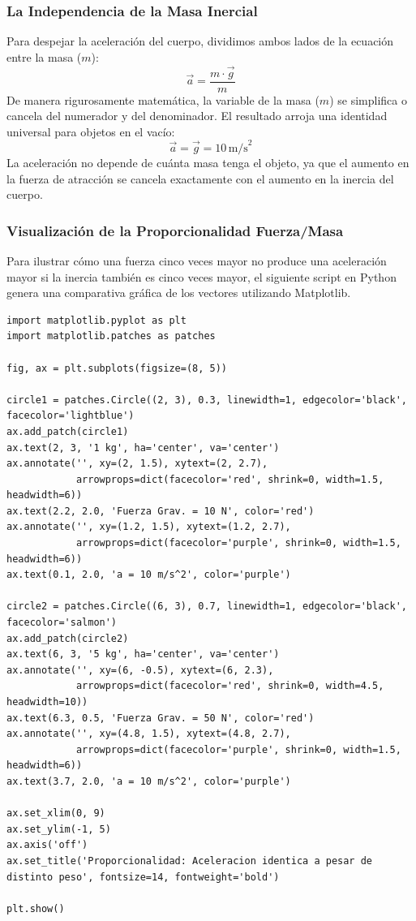 \documentclass[12pt]{article}
\begin{document}
\subsubsection*{La Independencia de la Masa Inercial}
Para despejar la aceleración del cuerpo, dividimos ambos lados de la ecuación entre la masa ($m$):
\begin{equation}
    \vec{a} = \frac{m \cdot \vec{g}}{m}
\end{equation}
De manera rigurosamente matemática, la variable de la masa ($m$) se simplifica o cancela del numerador y del denominador. El resultado arroja una identidad universal para objetos en el vacío:
\begin{equation}
    \vec{a} = \vec{g} = 10 \, \text{m/s}^2
\end{equation}
La aceleración no depende de cuánta masa tenga el objeto, ya que el aumento en la fuerza de atracción se cancela exactamente con el aumento en la inercia del cuerpo.

\subsubsection*{Visualización de la Proporcionalidad Fuerza/Masa}
Para ilustrar cómo una fuerza cinco veces mayor no produce una aceleración mayor si la inercia también es cinco veces mayor, el siguiente script en Python genera una comparativa gráfica de los vectores utilizando Matplotlib.

\begin{lstlisting}
import matplotlib.pyplot as plt
import matplotlib.patches as patches

fig, ax = plt.subplots(figsize=(8, 5))

circle1 = patches.Circle((2, 3), 0.3, linewidth=1, edgecolor='black', facecolor='lightblue')
ax.add_patch(circle1)
ax.text(2, 3, '1 kg', ha='center', va='center')
ax.annotate('', xy=(2, 1.5), xytext=(2, 2.7), 
            arrowprops=dict(facecolor='red', shrink=0, width=1.5, headwidth=6))
ax.text(2.2, 2.0, 'Fuerza Grav. = 10 N', color='red')
ax.annotate('', xy=(1.2, 1.5), xytext=(1.2, 2.7), 
            arrowprops=dict(facecolor='purple', shrink=0, width=1.5, headwidth=6))
ax.text(0.1, 2.0, 'a = 10 m/s^2', color='purple')

circle2 = patches.Circle((6, 3), 0.7, linewidth=1, edgecolor='black', facecolor='salmon')
ax.add_patch(circle2)
ax.text(6, 3, '5 kg', ha='center', va='center')
ax.annotate('', xy=(6, -0.5), xytext=(6, 2.3), 
            arrowprops=dict(facecolor='red', shrink=0, width=4.5, headwidth=10))
ax.text(6.3, 0.5, 'Fuerza Grav. = 50 N', color='red')
ax.annotate('', xy=(4.8, 1.5), xytext=(4.8, 2.7), 
            arrowprops=dict(facecolor='purple', shrink=0, width=1.5, headwidth=6))
ax.text(3.7, 2.0, 'a = 10 m/s^2', color='purple')

ax.set_xlim(0, 9)
ax.set_ylim(-1, 5)
ax.axis('off')
ax.set_title('Proporcionalidad: Aceleracion identica a pesar de distinto peso', fontsize=14, fontweight='bold')

plt.show()
\end{lstlisting}
\end{document}
